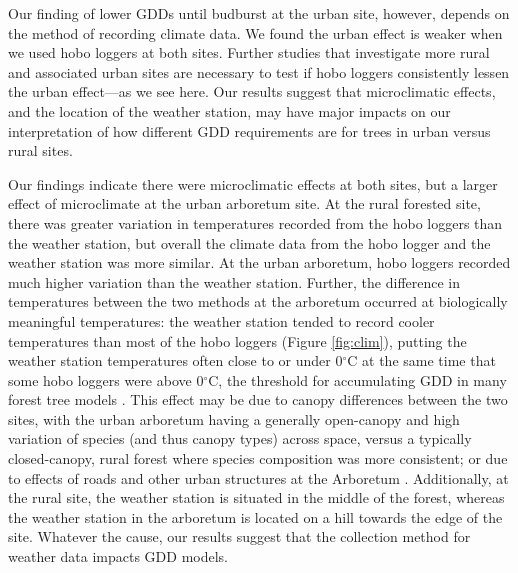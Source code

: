 \documentclass{article}\usepackage[]{graphicx}\usepackage[]{color}
\begin{document}
Our finding of lower GDDs until budburst at the urban site, however, depends on the method of recording climate data. We found the urban effect is weaker when we used hobo loggers at both sites. Further studies that investigate more rural and associated urban sites are necessary to test if hobo loggers consistently lessen the urban effect---as we see here. Our results suggest that microclimatic effects, and the location of the weather station, may have major impacts on our interpretation of how different GDD requirements are for trees in urban versus rural sites. 

Our findings indicate there were microclimatic effects at both sites, but a larger effect of microclimate at the urban arboretum site. At the rural forested site, there was greater variation in temperatures recorded from the hobo loggers than the weather station, but overall the climate data from the hobo logger and the weather station was more similar. At the urban arboretum, hobo loggers recorded much higher variation than the weather station. Further, the difference in temperatures between the two methods at the arboretum occurred at biologically meaningful temperatures: the weather station tended to record cooler temperatures than most of the hobo loggers (Figure \ref{fig:clim}), putting the weather station temperatures often close to or under 0$^{\circ}$C at the same time that some hobo loggers were above 0$^{\circ}$C, the threshold for accumulating GDD in many forest tree models \citep{Man2010}. This effect may be due to canopy differences between the two sites, with the urban arboretum having a generally open-canopy and high variation of species (and thus canopy types) across space, versus a typically closed-canopy, rural forest where species composition was more consistent; or due to effects of roads and other urban structures at the Arboretum \citep{Stabler2005,Erell2012,Dimoudi2013}. Additionally, at the rural site, the weather station is situated in the middle of the forest, whereas the weather station in the arboretum is located on a hill towards the edge of the site. Whatever the cause, our results suggest that the collection method for weather data impacts GDD models.
\end{document}
